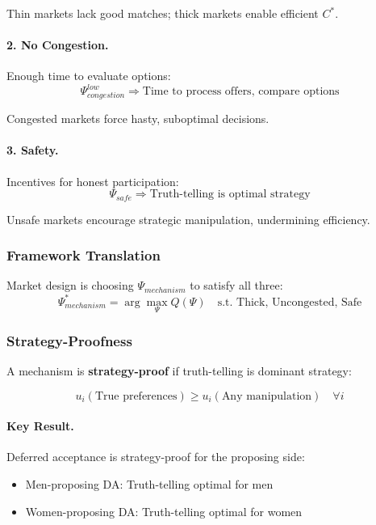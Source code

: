 Thin markets lack good matches; thick markets enable efficient $C^*$.

\paragraph{2. No Congestion.}
Enough time to evaluate options:
\begin{equation}
\Psi_{congestion}^{low} \Rightarrow \text{Time to process offers, compare options}
\end{equation}

Congested markets force hasty, suboptimal decisions.

\paragraph{3. Safety.}
Incentives for honest participation:
\begin{equation}
\Psi_{safe} \Rightarrow \text{Truth-telling is optimal strategy}
\end{equation}

Unsafe markets encourage strategic manipulation, undermining efficiency.

\subsubsection{Framework Translation}

Market design is choosing $\Psi_{mechanism}$ to satisfy all three:
\begin{equation}
\Psi^*_{mechanism} = \arg\max_{\Psi} Q(\Psi) \quad \text{s.t. Thick, Uncongested, Safe}
\end{equation}

\subsubsection{Strategy-Proofness}

A mechanism is \textbf{strategy-proof} if truth-telling is dominant strategy:

\begin{equation}
\boxed{
u_i(\text{True preferences}) \geq u_i(\text{Any manipulation}) \quad \forall i
}
\label{eq:strategyproof}
\end{equation}

\paragraph{Key Result.}
Deferred acceptance is strategy-proof for the proposing side:
\begin{itemize}
    \item Men-proposing DA: Truth-telling optimal for men
    \item Women-proposing DA: Truth-telling optimal for women
\end{itemize}

